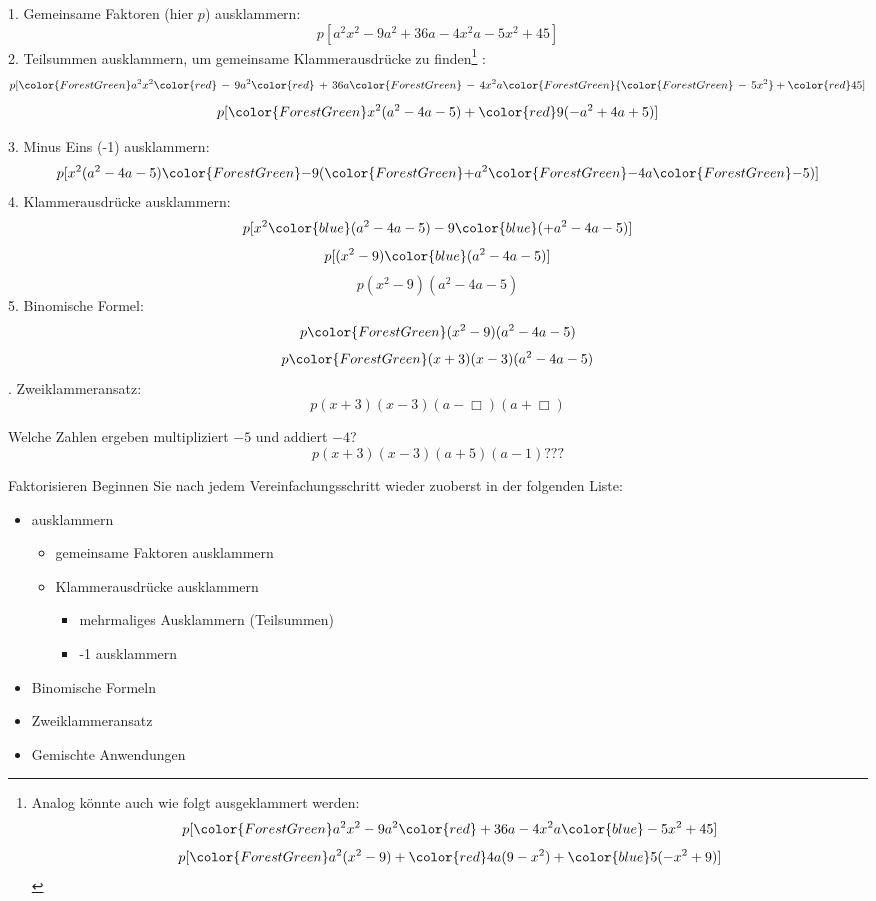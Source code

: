 
1. Gemeinsame Faktoren (hier $p$) ausklammern:
$$p[a^2x^2 - 9a^2 + 36a -4x^2a -5x^2 + 45]$$
2. Teilsummen ausklammern, um gemeinsame Klammerausdrücke zu finden\footnote{
Analog könnte auch wie folgt ausgeklammert werden:
$$p[{\color{ForestGreen}a^2x^2 -9a^2} {\color{red}+ 36a -4x^2a} {\color{blue}- 5x^2 + 45}]$$
$$p[{\color{ForestGreen}a^2}(x^2 - 9) + {\color{red}4a}(9 - x^2) + {\color{blue}5}(-x^2 + 9)]$$
}
:
$$p[{\color{ForestGreen}a^2x^2 } {\color{red}\, -\, 9a^2} {\color{red}\, +\, 36a} {\color{ForestGreen}\, -\, 4x^2a} {\color{ForestGreen} {\color{ForestGreen}\,-\,5x^2} } + {\color{red}45}]$$
$$p[{\color{ForestGreen}x^2} (a^2 -4a -5) + {\color{red}9}(-a^2 + 4a +5)]$$

3. Minus Eins (-1) ausklammern:
$$p[x^2 (a^2 -4a -5) {\color{ForestGreen}-} 9({\color{ForestGreen}+}a^2 {\color{ForestGreen}-} 4a {\color{ForestGreen}-} 5)]$$
4. Klammerausdrücke ausklammern:
$$p[x^2 {\color{blue}(a^2 -4a -5)} - 9{\color{blue}(+a^2 - 4a - 5)}]$$
$$p[(x^2-9) {\color{blue}(a^2 -4a -5)}]$$
$$p(x^2-9) (a^2 -4a -5)$$
5. Binomische Formel:
$$p{\color{ForestGreen}(x^2-9)}(a^2 -4a -5)$$
$$p{\color{ForestGreen}(x+3)(x-3)}(a^2 -4a -5)$$
. Zweiklammeransatz:
$$p(x+3)(x-3) (a-\Box{})(a+\Box{})$$

Welche Zahlen ergeben multipliziert $-5$ und addiert $-4$?
$$p(x+3)(x-3)(a+5)(a-1) ???$$
\begin{center}{}\end{center}



\newpage

\begin{rezept}{Faktorisieren}{}
Beginnen Sie nach jedem Vereinfachungsschritt wieder zuoberst in der
folgenden Liste:

\begin{itemize}
\item ausklammern
 \begin{itemize}
  \item gemeinsame Faktoren ausklammern
  \item Klammerausdrücke ausklammern
   \begin{itemize}
   \item mehrmaliges Ausklammern (Teilsummen)
  \item -1 ausklammern
  \end{itemize}
\end{itemize}
\item Binomische Formeln
\item Zweiklammeransatz
\item Gemischte Anwendungen
\end{itemize}

\end{rezept}


